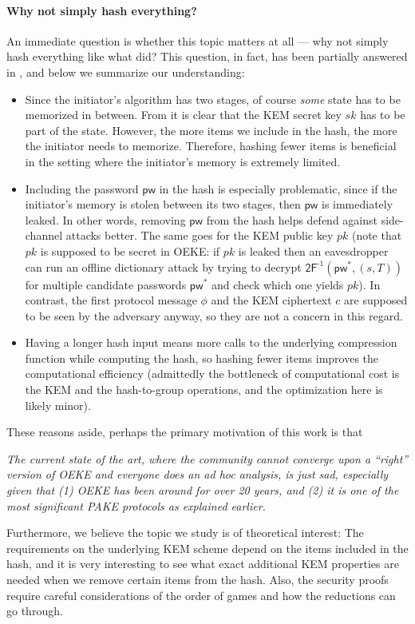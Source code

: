 \documentclass{article}
\theoremstyle{plain}
\theoremstyle{definition}
\theoremstyle{remark}
\newcommand{\pw}{\mathsf{pw}}
\begin{document}
\paragraph{Why not simply hash everything?}
An immediate question is whether this topic matters at all --- why not simply hash everything like what \cite{EPRINT:ArrBarJar25} did? This question, in fact, has been partially answered in \cite[Section~5]{EPRINT:ArrBarJar25}, and below we summarize our understanding:
\begin{itemize}
  \item Since the initiator's algorithm has two stages, of course \emph{some} state has to be memorized in between. From  it is clear that the KEM secret key $sk$ has to be part of the state. However, the more items we include in the hash, the more the initiator needs to memorize. Therefore, hashing fewer items is beneficial in the setting where the initiator's memory is extremely limited.
  \item Including the password $\pw$ in the hash is especially problematic, since if the initiator's memory is stolen between its two stages, then $\pw$ is immediately leaked. In other words, removing $\pw$ from the hash helps defend against side-channel attacks better. The same goes for the KEM public key $pk$ (note that $pk$ is supposed to be secret in OEKE: if $pk$ is leaked then an eavesdropper can run an offline dictionary attack by trying to decrypt $\mathsf{2F}^{\text{-}1}(\pw^*,(s,T))$ for multiple candidate passwords $\pw^*$ and check which one yields $pk$). In contrast, the first protocol message $\phi$ and the KEM ciphertext $c$ are supposed to be seen by the adversary anyway, so they are not a concern in this regard.
  \item Having a longer hash input means more calls to the underlying compression function while computing the hash, so hashing fewer items improves the computational efficiency (admittedly the bottleneck of computational cost is the KEM and the hash-to-group operations, and the optimization here is likely minor).
\end{itemize}
These reasons aside, perhaps the primary motivation of this work is that
\begin{displayquote}
  \emph{The current state of the art, where the community cannot converge upon a ``right'' version of OEKE and everyone does an ad hoc analysis, is just sad, especially given that (1) OEKE has been around for over 20 years, and (2) it is one of the most significant PAKE protocols as explained earlier.}
\end{displayquote}
Furthermore, we believe the topic we study is of theoretical interest: The requirements on the underlying KEM scheme depend on the items included in the hash, and it is very interesting to see what exact additional KEM properties are needed when we remove certain items from the hash. Also, the security proofs require careful considerations of the order of games and how the reductions can go through.
\end{document}
